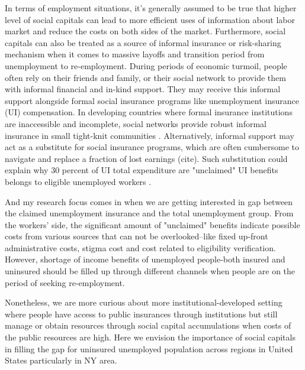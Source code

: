 \documentclass{article}
\begin{document}

In terms of employment situations, it's generally assumed to be true that higher level of social capitals can lead to more efficient uses of information about labor market and reduce the costs on both sides of the market. Furthermore, social capitals can also be treated as a source of informal insurance or risk-sharing mechanism when it comes to massive layoffs and transition period from unemployment to re-employment. During periods of economic turmoil, people often rely on their friends and family, or their social network to provide them with informal financial and in-kind support. They may receive this informal support alongside formal social insurance programs like unemployment insurance (UI) compensation. In developing countries where formal insurance institutions are inaccessible and incomplete, social networks provide robust informal insurance in small tight-knit communities \cite{microfinance}. Alternatively, informal support may act as a substitute for social insurance programs, which are often cumbersome to navigate and replace a fraction of lost earnings (cite). Such substitution could explain why 30 percent of UI total expenditure are "unclaimed" UI benefits belongs to eligible unemployed workers \cite{gap_takeup}.

And my research focus comes in when we are getting interested in gap between the claimed unemployment insurance and the total unemployment group. From the workers' side, the significant amount of "unclaimed" benefits indicate possible costs from various sources that can not be overlooked--like fixed up-front administrative costs, stigma cost and cost related to eligibility verification. However, shortage of income benefits of unemployed people-both insured and uninsured should be filled up through different channels when people are on the period of seeking re-employment. 


Nonetheless, we are more curious about more institutional-developed setting where people have access to public insurances through institutions but still manage or obtain resources through social capital accumulations when costs of the public resources are high. Here we envision the importance of social capitals in filling the gap for uninsured unemployed population across regions in United States particularly in NY area. 
\end{document}
